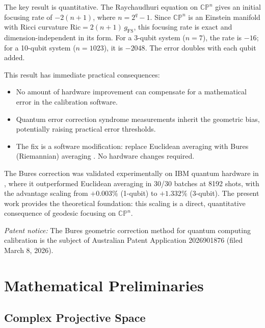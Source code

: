 \documentclass[12pt,a4paper]{article}
\begin{document}
The key result is quantitative. The Raychaudhuri equation \cite{raychaudhuri1955} on $\mathbb{CP}^n$ gives an initial focusing rate of $-2(n+1)$, where $n = 2^q - 1$. Since $\mathbb{CP}^n$ is an Einstein manifold with Ricci curvature $\text{Ric} = 2(n+1)\,g_{\text{FS}}$, this focusing rate is exact and dimension-independent in its form. For a 3-qubit system ($n = 7$), the rate is $-16$; for a 10-qubit system ($n = 1023$), it is $-2048$. The error doubles with each qubit added.

This result has immediate practical consequences:
\begin{itemize}
    \item No amount of hardware improvement can compensate for a mathematical error in the calibration software.
    \item Quantum error correction syndrome measurements inherit the geometric bias, potentially raising practical error thresholds.
    \item The fix is a software modification: replace Euclidean averaging with Bures (Riemannian) averaging \cite{bures1969}. No hardware changes required.
\end{itemize}

The Bures correction was validated experimentally on IBM quantum hardware in \cite{muir2026}, where it outperformed Euclidean averaging in 30/30 batches at 8192 shots, with the advantage scaling from $+0.003\%$ (1-qubit) to $+1.332\%$ (3-qubit). The present work provides the theoretical foundation: this scaling is a direct, quantitative consequence of geodesic focusing on $\mathbb{CP}^n$.

\textit{Patent notice:} The Bures geometric correction method for quantum computing calibration is the subject of Australian Patent Application 2026901876 (filed March 8, 2026).

\section{Mathematical Preliminaries}
\label{sec:prelim}

\subsection{Complex Projective Space}
\end{document}
